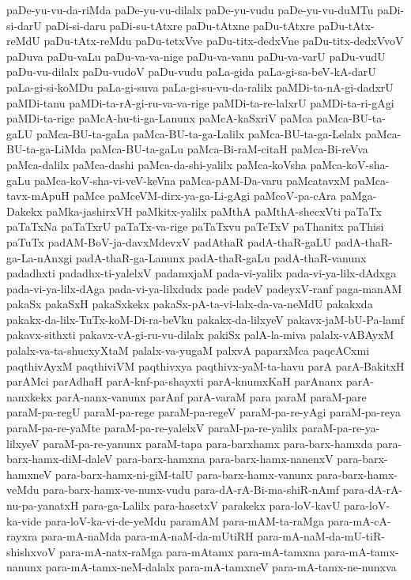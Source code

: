 {paDe-yu-vu-da-riMda
paDe-yu-vu-dilalx
paDe-yu-vudu
paDe-yu-vu-duMTu
paDi-si-darU
paDi-si-daru
paDi-su-tAtxre
paDu-tAtxne
paDu-tAtxre
paDu-tAtx-reMdU
paDu-tAtx-reMdu
paDu-tetxVve
paDu-titx-dedxVne
paDu-titx-dedxVvoV
paDuva
paDu-vaLu
paDu-va-va-nige
paDu-va-vanu
paDu-va-varU
paDu-vudU
paDu-vu-dilalx
paDu-vudoV
paDu-vudu
paLa-gida
paLa-gi-sa-beV-kA-darU
paLa-gi-si-koMDu
paLa-gi-suva
paLa-gi-su-vu-da-ralilx
paMDi-ta-nA-gi-dadxrU
paMDi-tanu
paMDi-ta-rA-gi-ru-va-va-rige
paMDi-ta-re-lalxrU
paMDi-ta-ri-gAgi
paMDi-ta-rige
paMcA-hu-ti-ga-Lanunx
paMcA-kaSxriV
paMca
paMca-BU-ta-gaLU
paMca-BU-ta-gaLa
paMca-BU-ta-ga-Lalilx
paMca-BU-ta-ga-Lelalx
paMca-BU-ta-ga-LiMda
paMca-BU-ta-gaLu
paMca-Bi-raM-citaH
paMca-Bi-reVva
paMca-dalilx
paMca-dashi
paMca-da-shi-yalilx
paMca-koVsha
paMca-koV-sha-gaLu
paMca-koV-sha-vi-veV-keVna
paMca-pAM-Da-varu
paMcatavxM
paMca-tavx-mApuH
paMce
paMceVM-dirx-ya-ga-Li-gAgi
paMcoV-pa-cAra
paMga-Dakekx
paMka-jashirxVH
paMkitx-yalilx
paMthA
paMthA-shecxVti
paTaTx
paTaTxNa
paTaTxrU
paTaTx-va-rige
paTaTxvu
paTeTxV
paThanitx
paThisi
paTuTx
padAM-BoV-ja-davxMdevxV
padAthaR
padA-thaR-gaLU
padA-thaR-ga-La-nAnxgi
padA-thaR-ga-Lanunx
padA-thaR-gaLu
padA-thaR-vanunx
padadhxti
padadhx-ti-yalelxV
padamxjaM
pada-vi-yalilx
pada-vi-ya-lilx-dAdxga
pada-vi-ya-lilx-dAga
pada-vi-ya-lilxdudx
pade
padeV
padeyxV-ranf
paga-manAM
pakaSx
pakaSxH
pakaSxkekx
pakaSx-pA-ta-vi-lalx-da-va-neMdU
pakakxda
pakakx-da-lilx-TuTx-koM-Di-ra-beVku
pakakx-da-lilxyeV
pakavx-jaM-bU-Pa-lamf
pakavx-sithxti
pakavx-vA-gi-ru-vu-dilalx
pakiSx
palA-la-miva
palalx-vABAyxM
palalx-va-ta-shucxyXtaM
palalx-va-yugaM
palxvA
paparxMca
paqcACxmi
paqthivAyxM
paqthiviVM
paqthivxya
paqthivx-yaM-ta-havu
parA
parA-BakitxH
parAMci
parAdhaH
parA-knf-pa-shayxti
parA-knumxKaH
parAnanx
parA-nanxkekx
parA-nanx-vanunx
parAnf
parA-varaM
para
paraM
paraM-pare
paraM-pa-regU
paraM-pa-rege
paraM-pa-regeV
paraM-pa-re-yAgi
paraM-pa-reya
paraM-pa-re-yaMte
paraM-pa-re-yalelxV
paraM-pa-re-yalilx
paraM-pa-re-ya-lilxyeV
paraM-pa-re-yanunx
paraM-tapa
para-barxhamx
para-barx-hamxda
para-barx-hamx-diM-daleV
para-barx-hamxna
para-barx-hamx-nanenxV
para-barx-hamxneV
para-barx-hamx-ni-giM-talU
para-barx-hamx-vanunx
para-barx-hamx-veMdu
para-barx-hamx-ve-nunx-vudu
para-dA-rA-Bi-ma-shiR-nAmf
para-dA-rA-nu-pa-yanatxH
para-ga-Lalilx
para-hasetxV
parakekx
para-loV-kavU
para-loV-ka-vide
para-loV-ka-vi-de-yeMdu
paramAM
para-mAM-ta-raMga
para-mA-cA-rayxra
para-mA-naMda
para-mA-naM-da-mUtiRH
para-mA-naM-da-mU-tiR-shishxvoV
para-mA-natx-raMga
para-mAtamx
para-mA-tamxna
para-mA-tamx-nanunx
para-mA-tamx-neM-dalalx
para-mA-tamxneV
para-mA-tamx-ne-nunxva
}
